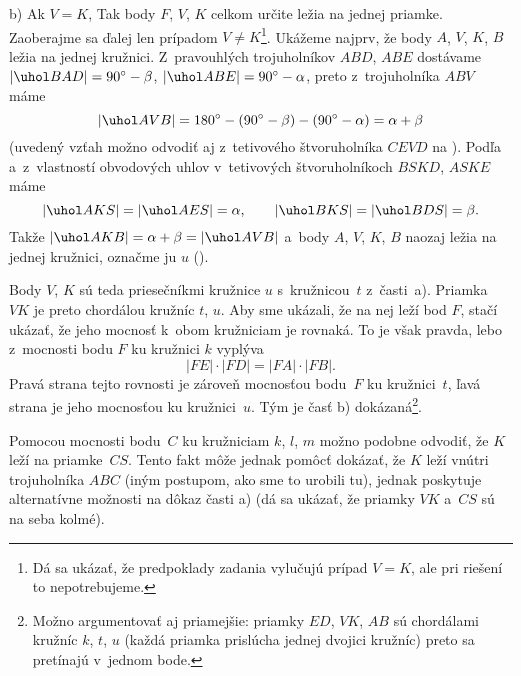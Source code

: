 {\smallskip
b)
Ak $V=K$, Tak body $F$, $V$, $K$ celkom určite ležia na jednej priamke. Zaoberajme sa ďalej len prípadom $V\ne K$\footnote{Dá sa ukázať, že predpoklady zadania vylučujú prípad $V=K$, ale pri riešení to nepotrebujeme.}. Ukážeme najprv, že body $A$, $V$, $K$, $B$ ležia na jednej kružnici. Z~pravouhlých trojuholníkov $ABD$, $ABE$ dostávame $|\uhol BAD|=90^\circ-\beta$, $|\uhol ABE|=90^\circ-\alpha$, preto z~trojuholníka $ABV$ máme
$$
|\uhol AVB|=180^\circ-(90^\circ-\beta)-(90^\circ-\alpha)=\alpha+\beta
$$
(uvedený vzťah možno odvodiť aj z~tetivového štvoruholníka $CEVD$ na ). Podľa  a~z~vlastností obvodových uhlov v~tetivových štvoruholníkoch $BSKD$, $ASKE$ máme
$$
|\uhol AKS|=|\uhol AES|=\alpha,\qquad |\uhol BKS|=|\uhol BDS|=\beta.
$$
Takže $|\uhol AKB|=\alpha+\beta=|\uhol AVB|$ a~body $A$, $V$, $K$, $B$ naozaj ležia na jednej kružnici, označme ju $u$ (\obr).
%

Body $V$, $K$ sú teda priesečníkmi kružnice $u$ s~kružnicou~$t$ z~časti~a). Priamka~$VK$ je preto chordálou kružníc $t$, $u$. Aby sme ukázali, že na nej leží bod $F$, stačí ukázať, že jeho mocnosť k~obom kružniciam je rovnaká. To je však pravda, lebo z~mocnosti bodu $F$ ku kružnici $k$ vyplýva
$$
|FE|\cdot|FD|=|FA|\cdot|FB|.
$$
Pravá strana tejto rovnosti je zároveň mocnosťou bodu~$F$ ku kružnici~$t$, ľavá strana je jeho mocnosťou ku kružnici~$u$. Tým je časť b) dokázaná\footnote{Možno argumentovať aj priamejšie: priamky $ED$, $VK$, $AB$ sú chordálami kružníc $k$, $t$, $u$ (každá priamka prislúcha jednej dvojici kružníc) preto sa pretínajú v~jednom bode.}.

\poznamka
Pomocou mocnosti bodu~$C$ ku kružniciam $k$, $l$, $m$ možno podobne odvodiť, že $K$ leží na priamke~$CS$. Tento fakt môže jednak pomôcť dokázať, že $K$ leží vnútri trojuholníka $ABC$ (iným postupom, ako sme to urobili tu), jednak poskytuje alternatívne možnosti na dôkaz časti a) (dá sa ukázať, že priamky $VK$ a~$CS$ sú na seba kolmé).
}

